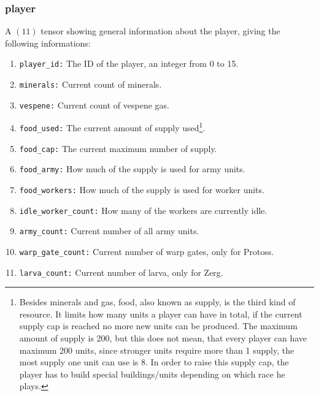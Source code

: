 \documentclass{article}
\begin{document}
\subsubsection{player}
A $(11)$ tensor showing general information about the player, giving the following informations:
\begin{enumerate}[noitemsep,start=0]
\item \texttt{player\_id:} The ID of the player, an integer from 0 to 15.
\item \texttt{minerals:} Current count of minerals.
\item \texttt{vespene:} Current count of vespene gas.
\item \texttt{food\_used:} The current amount of supply used\footnote{Besides 
minerals and gas, food, also known as supply, is the third kind of resource. It 
limits how many units a player can have in total, if the current supply cap is 
reached no more new units can be produced. The maximum amount of supply is 200, 
but this does not mean, that every player can have maximum 200 units, since 
stronger units require more than 1 supply, the most supply one unit can use is 
8. In order to raise this supply cap, the player has to build special 
buildings/units depending on which race he plays.}.
\item \texttt{food\_cap:} The current maximum number of supply.
\item \texttt{food\_army:} How much of the supply is used for army units.
\item \texttt{food\_workers:} How much of the supply is used for worker units.
\item \texttt{idle\_worker\_count:} How many of the workers are currently idle.
\item \texttt{army\_count:} Current number of all army units.
\item \texttt{warp\_gate\_count:} Current number of warp gates, only for 
Protoss.
\item \texttt{larva\_count:} Current number of larva, only for Zerg.
\end{enumerate}
\end{document}
